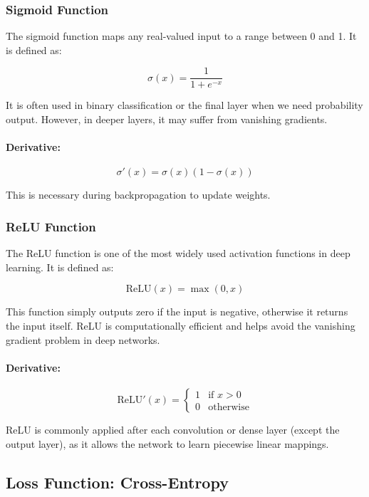 \documentclass[conference]{IEEEtran}
\begin{document}
\subsubsection{Sigmoid Function}

The sigmoid function maps any real-valued input to a range between 0 and 1. It is defined as:

\[
\sigma(x) = \frac{1}{1 + e^{-x}}
\]

It is often used in binary classification or the final layer when we need probability output. However, in deeper layers, it may suffer from vanishing gradients.

\paragraph{Derivative:}

\[
\sigma'(x) = \sigma(x)(1 - \sigma(x))
\]

This is necessary during backpropagation to update weights.

\subsubsection{ReLU Function}

The ReLU function is one of the most widely used activation functions in deep learning. It is defined as:

\[
\text{ReLU}(x) = \max(0, x)
\]

This function simply outputs zero if the input is negative, otherwise it returns the input itself. ReLU is computationally efficient and helps avoid the vanishing gradient problem in deep networks.

\paragraph{Derivative:}

\[
\text{ReLU}'(x) =
\begin{cases}
1 & \text{if } x > 0 \\
0 & \text{otherwise}
\end{cases}
\]

ReLU is commonly applied after each convolution or dense layer (except the output layer), as it allows the network to learn piecewise linear mappings.


\subsection{Loss Function: Cross-Entropy}
\end{document}
